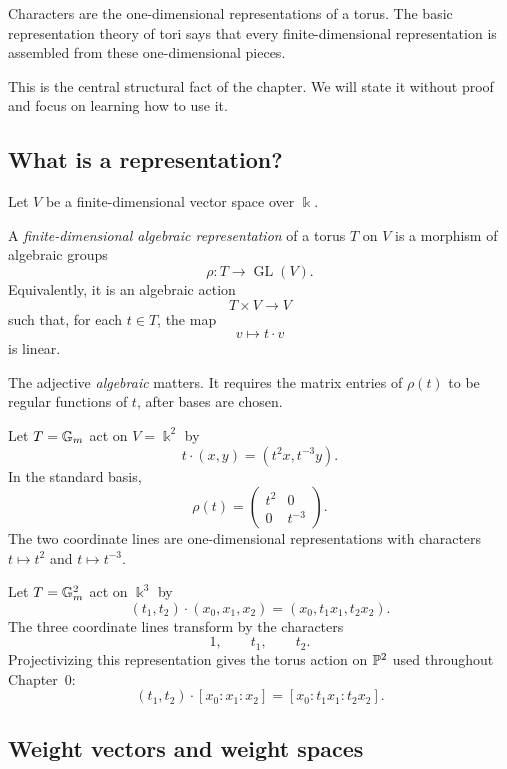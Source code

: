 Characters are the one-dimensional representations of a torus. The
basic representation theory of tori says that every finite-dimensional
representation is assembled from these one-dimensional pieces.

This is the central structural fact of the chapter. We will state it
without proof and focus on learning how to use it.

\subsection{What is a representation?}

Let \(V\) be a finite-dimensional vector space over \(\Bbbk\).

\begin{definition}
A \emph{finite-dimensional algebraic representation} of a torus \(T\)
on \(V\) is a morphism of algebraic groups
\[
\rho:T\longrightarrow\operatorname{GL}(V).
\]
Equivalently, it is an algebraic action
\[
T\times V\longrightarrow V
\]
such that, for each \(t\in T\), the map
\[
v\longmapsto t\cdot v
\]
is linear.
\end{definition}

The adjective \emph{algebraic} matters. It requires the matrix entries of \(\rho(t)\) to be regular functions of \(t\), after bases are chosen.

\begin{example}
Let \(T=\mathbb{G}_{m}\) act on \(V=\Bbbk^2\) by
\[
t\cdot(x,y)=(t^2x,t^{-3}y).
\]
In the standard basis,
\[
\rho(t)
=
\begin{pmatrix}
t^2&0\\
0&t^{-3}
\end{pmatrix}.
\]
The two coordinate lines are one-dimensional representations with
characters \(t\mapsto t^2\) and \(t\mapsto t^{-3}\).
\end{example}

\begin{example}
Let \(T=\mathbb{G}_{m}^2\) act on \(\Bbbk^3\) by
\[
(t_1,t_2)\cdot(x_0,x_1,x_2)
=
(x_0,t_1x_1,t_2x_2).
\]
The three coordinate lines transform by the characters
\[
1,\qquad t_1,\qquad t_2.
\]
Projectivizing this representation gives the torus action on
\(\mathbb{P}^2\) used throughout Chapter~0:
\[
(t_1,t_2)\cdot[x_0:x_1:x_2]
=
[x_0:t_1x_1:t_2x_2].
\]
\end{example}

\subsection{Weight vectors and weight spaces}

